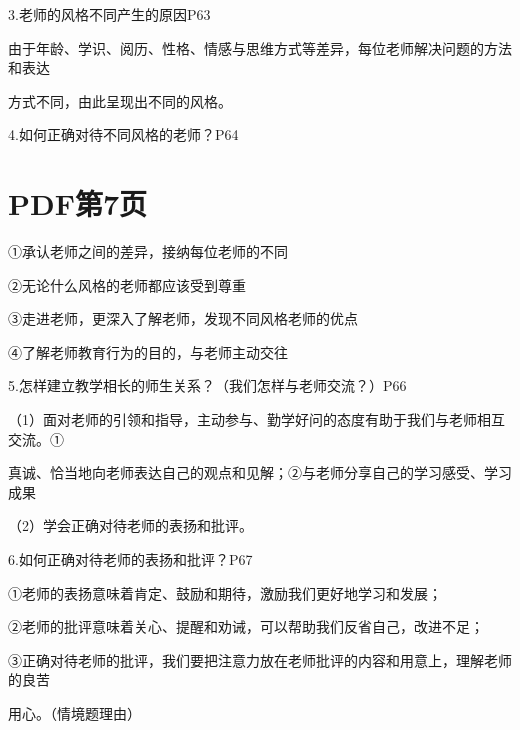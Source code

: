 \documentclass[lang=cn,11pt]{elegantbook}
\newcommand{\daofasym}[1]{{\daofasymbolfont #1}}
\newcommand{\daofasym}[1]{#1}
\begin{document}
3.老师的风格不同产生的原因P63\par

由于年龄、学识、阅历、性格、情感与思维方式等差异，每位老师解决问题的方法和表达\par

方式不同，由此呈现出不同的风格。\par

4.如何正确对待不同风格的老师？P64\par


\section*{PDF第7页}

\daofasym{①}承认老师之间的差异，接纳每位老师的不同\par

\daofasym{②}无论什么风格的老师都应该受到尊重\par

\daofasym{③}走进老师，更深入了解老师，发现不同风格老师的优点\par

\daofasym{④}了解老师教育行为的目的，与老师主动交往\par

5.怎样建立教学相长的师生关系？（我们怎样与老师交流？）P66\par

（1）面对老师的引领和指导，主动参与、勤学好问的态度有助于我们与老师相互交流。\daofasym{①}\par

真诚、恰当地向老师表达自己的观点和见解；\daofasym{②}与老师分享自己的学习感受、学习成果\par

（2）学会正确对待老师的表扬和批评。\par

6.如何正确对待老师的表扬和批评？P67\par

\daofasym{①}老师的表扬意味着肯定、鼓励和期待，激励我们更好地学习和发展；\par

\daofasym{②}老师的批评意味着关心、提醒和劝诫，可以帮助我们反省自己，改进不足；\par

\daofasym{③}正确对待老师的批评，我们要把注意力放在老师批评的内容和用意上，理解老师的良苦\par

用心。（情境题理由）\par
\end{document}
